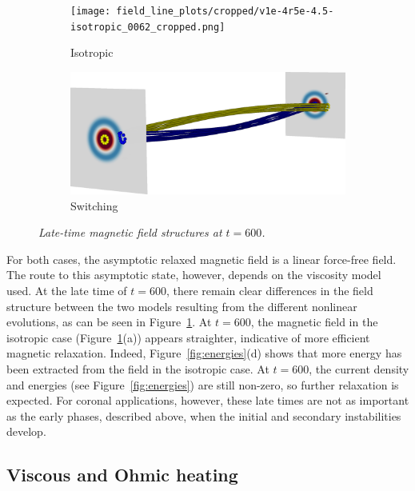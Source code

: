 \begin{figure}[t]
  \centering
  \begin{subfigure}[b]{0.48\textwidth}
    \texttt{[image: field\_line\_plots/cropped/v1e-4r5e-4.5-isotropic\_0062\_cropped.png]}
    \caption{Isotropic}
  \end{subfigure}
  \begin{subfigure}[b]{0.48\textwidth}
    \includegraphics[width=\linewidth]{field_line_plots/cropped/v1e-4r5e-4.5-switching_0059_cropped.png}
    \caption{Switching}
  \end{subfigure}
  \caption{\textit{Late-time magnetic field structures at $t=600$.}}
\label{fig:finale-field-lines}
\end{figure}

For both cases, the asymptotic relaxed magnetic field is a linear force-free field. The route to this asymptotic state, however, depends on the viscosity model used. At the late time of $t=600$, there remain clear differences in the field structure between the two models resulting from the different nonlinear evolutions, as can be seen in Figure~\ref{fig:finale-field-lines}. At $t=600$, the magnetic field in the isotropic case (Figure~\ref{fig:finale-field-lines}(a)) appears straighter, indicative of more efficient magnetic relaxation. Indeed, Figure~\ref{fig:energies}(d) shows that more energy has been extracted from the field in the isotropic case. At $t=600$, the current density and energies (see Figure~\ref{fig:energies}) are still non-zero, so further relaxation is expected. For coronal applications, however, these late times are not as important as the early phases, described above, when the initial and secondary instabilities develop.

\subsection{Viscous and Ohmic heating}

